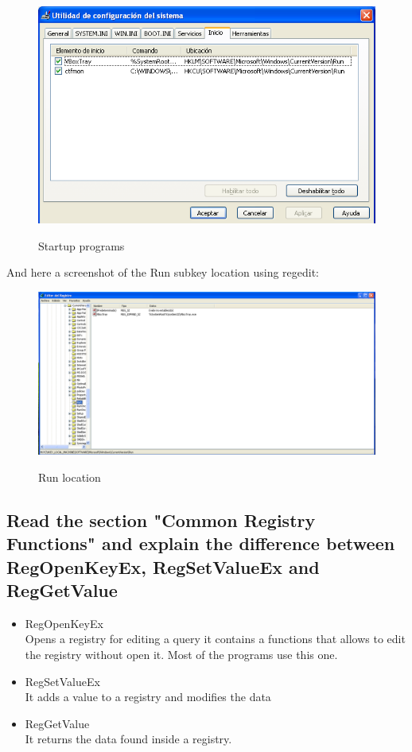 \documentclass[10pt,a4paper]{article} %
\begin{document}
        \begin{figure}[h]
            \centering
            \includegraphics[scale=0.5]{2.png}
            \label{2}
            \caption{Startup programs}
        \end{figure}

        And here a screenshot of the Run subkey location using regedit:\newpage

        \begin{figure}[h]
            \centering
            \includegraphics[scale=0.4]{3.png}
            \label{3}
            \caption{Run location}
        \end{figure}

        \subsection{Read the section "Common Registry Functions" and explain the
        difference between RegOpenKeyEx, RegSetValueEx and RegGetValue}

        \begin{itemize}
            \item RegOpenKeyEx\\
            Opens a registry for editing a query it contains a functions that
            allows to edit the registry without open it. Most of the programs use
            this one.
            \item RegSetValueEx\\
            It adds a value to a registry and modifies the data
            \item RegGetValue\\
            It returns the data found inside a registry.
        \end{itemize}
\end{document}
